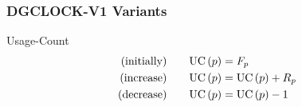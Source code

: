 
\begin{frame}
    \frametitle{DGCLOCK-V1 Variants}

    \begin{block}{Usage-Count}
        \vspace{-2em}
        \begin{align*}
            \text{(initially)\qquad}\text{UC}\left(p\right) &= F_p\\
            \text{(increase)\qquad}\text{UC}\left(p\right) &= \text{UC}\left(p\right) + R_p\\
            \text{(decrease)\qquad}\text{UC}\left(p\right) &= \text{UC}\left(p\right) - 1
        \end{align*}
        \vspace{-1.5em}
    \end{block}


\end{frame}
